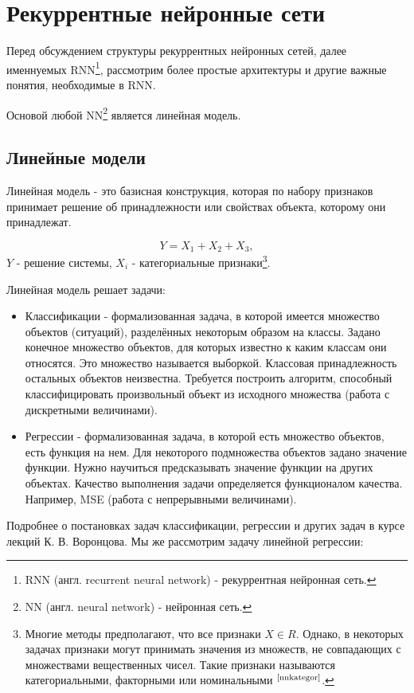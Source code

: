 \documentclass[a4paper,11pt]{article} %
\begin{document}
\newpage
\section{Рекуррентные нейронные сети}
Перед обсуждением структуры рекуррентных нейронных сетей,  далее именнуемых RNN\footnote{RNN (англ.  recurrent neural network) -  рекуррентная нейронная сеть.}, рассмотрим более простые архитектуры и  другие важные понятия,  необходимые в RNN. 

Основой любой NN\footnote{NN (англ.  neural network) -  нейронная  сеть.} является линейная модель.

\subsection{Линейные модели}

Линейная модель - это базисная конструкция,  которая по набору признаков  принимает решение об принадлежности или свойствах объекта,  которому они принадлежат.

$$Y=X_1+X_2+X_3,$$
$Y$ -  решение  системы,  $X_i$ - категориальные признаки\footnote{Многие методы предполагают, что все признаки $X\in R$. Однако, в некоторых задачах признаки могут принимать значения из множеств, не совпадающих с множествами вещественных чисел. Такие признаки называются категориальными, факторными или номинальными $^\text{\cite{nnkategor}}$.}.

 Линейная модель решает задачи:
\begin{itemize}
\item Классификации - формализованная задача, в которой имеется множество объектов (ситуаций), разделённых некоторым образом на классы. Задано конечное множество объектов, для которых известно к каким классам они относятся. Это множество называется выборкой. Классовая принадлежность остальных объектов неизвестна. Требуется построить алгоритм, способный классифицировать произвольный объект из исходного множества (работа с дискретными величинами).
\item Регрессии - формализованная задача, в которой есть множество объектов, есть функция на нем. Для некоторого подмножества объектов задано значение функции. Нужно научиться предсказывать значение функции на других объектах. Качество выполнения задачи определяется функционалом качества. Например, MSE (работа с непрерывными величинами).
\end{itemize}

Подробнее о постановках задач классификации, регрессии и других задач в курсе лекций К. В. Воронцова\cite{voron}.  Мы же рассмотрим задачу линейной регрессии: 
\end{document}
